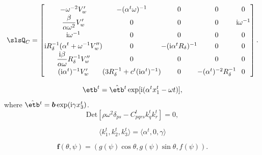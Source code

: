 \documentclass{jpp}
\begin{document}
{{\begin{equation}
\setlength{\arraycolsep}{0pt}
\renewcommand{\arraystretch}{1.3}
\slsQ_C = \left[
\begin{array}{ccccc}
  -\omega^{-2}V'_w  &  -(\alpha^t\omega)^{-1}  &  0  &  0  &  0  \\
  \displaystyle
  \frac{\beta}{\alpha\omega^2}V'_w  &  0  &  0  &  0  &  \mathrm{i}\omega^{-1} \\
  \mathrm{i}\omega^{-1}  &  0  &  0  &  0  &  0  \\
  \displaystyle
  \mathrm{i} R^{-1}_{\delta}(\alpha^t+\omega^{-1}V''_w)  &  0
    & -(\mathrm{i}\alpha^tR_\delta)^{-1}  &  0  &  0  \\
  \displaystyle
  \frac{\mathrm{i}\beta}{\alpha\omega}R^{-1}_\delta V''_w  &  0  &  0
    &  0  & 0 \\
  (\mathrm{i}\alpha^t)^{-1}V'_w  &  (3R^{-1}_{\delta}+c^t(\mathrm{i}\alpha^t)^{-1})
    &  0  &  -(\alpha^t)^{-2}R^{-1}_{\delta}  &  0  \\
\end{array}  \right] .
\label{defQc}
\end{equation}

\begin{equation}
\etb^t = \skew2\hat{\etb}^t \exp [\mathrm{i} (\alpha^tx^t_1-\omega t)],
\end{equation}
where $\skew2\hat{\etb}^t=\boldsymbol{b}\exp (\mathrm{i}\gamma x^t_3)$. 
\begin{equation}
\mbox{Det}[\rho\omega^2\delta_{ps}-C^t_{pqrs}k^t_qk^t_r]=0,
\end{equation}

\begin{equation}
 \langle k^t_1,k^t_2,k^t_3\rangle = \langle
\alpha^t,0,\gamma\rangle  
\end{equation}

\begin{equation}
\boldsymbol{f}(\theta,\psi) = (g(\psi)\cos \theta,g(\psi) \sin \theta,f(\psi)).
\label{eq41}
\end{equation}

}}
\end{document}
